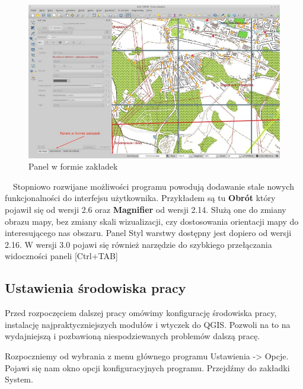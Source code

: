 \documentclass[12pt,a4paper]{book}
\begin{document}
\begin{figure}[ht]
	\centering
	\includegraphics[scale=0.45]{001-zakladki.jpg}
	\caption{Panel w formie zakładek}
\end{figure}

\ \ Stopniowo rozwijane możliwości programu powodują dodawanie stale nowych funkcjonalności do interfejsu użytkownika. Przykładem są tu \textbf{Obrót} który pojawił się od wersji 2.6 oraz \textbf{Magnifier} od wersji 2.14. Służą one do zmiany obrazu mapy, bez zmiany skali wizualizacji, czy dostosowania orientacji mapy do interesującego nas obszaru. Panel Styl warstwy dostępny jest dopiero od wersji 2.16. 
W wersji 3.0 pojawi się również narzędzie do szybkiego przełączania widoczności paneli [Ctrl+TAB]

\subsection{Ustawienia środowiska pracy}
Przed rozpoczęciem dalszej pracy omówimy konfigurację środowiska pracy, instalację najpraktyczniejszych modułów i wtyczek do QGIS. Pozwoli na to na wydajniejszą i pozbawioną niespodziewanych problemów dalszą pracę.

Rozpoczniemy od wybrania z menu głównego programu Ustawienia -{\textgreater} Opcje. Pojawi się nam okno opcji konfiguracyjnych programu. Przejdźmy do zakładki System. 
\end{document}
